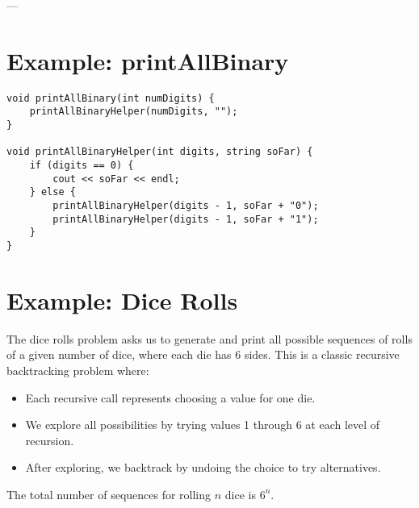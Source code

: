 \documentclass{article}
\begin{document}
---

\section{Example: printAllBinary}

\begin{center}
\end{center}

\begin{lstlisting}[style=cppstyle]
void printAllBinary(int numDigits) {
    printAllBinaryHelper(numDigits, "");
}

void printAllBinaryHelper(int digits, string soFar) {
    if (digits == 0) {
        cout << soFar << endl;
    } else {
        printAllBinaryHelper(digits - 1, soFar + "0");
        printAllBinaryHelper(digits - 1, soFar + "1");
    }
}
\end{lstlisting}

\section{Example: Dice Rolls}

The dice rolls problem asks us to generate and print all possible sequences of rolls of a given number of dice, where each die has 6 sides. This is a classic recursive backtracking problem where:
\begin{itemize}
    \item Each recursive call represents choosing a value for one die.
    \item We explore all possibilities by trying values 1 through 6 at each level of recursion.
    \item After exploring, we backtrack by undoing the choice to try alternatives.
\end{itemize}

The total number of sequences for rolling $n$ dice is $6^n$.
\end{document}

